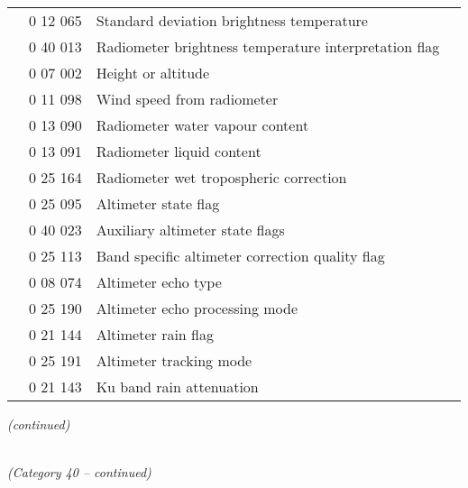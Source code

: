 \begin{longtable}[]{@{}llll@{}}
& 0 12 065 & Standard deviation brightness temperature &\tabularnewline
& 0 40 013 & Radiometer brightness temperature interpretation flag &\tabularnewline
& 0 07 002 & Height or altitude &\tabularnewline
& 0 11 098 & Wind speed from radiometer &\tabularnewline
& 0 13 090 & Radiometer water vapour content &\tabularnewline
& 0 13 091 & Radiometer liquid content &\tabularnewline
& 0 25 164 & Radiometer wet tropospheric correction &\tabularnewline
& 0 25 095 & Altimeter state flag &\tabularnewline
& 0 40 023 & Auxiliary altimeter state flags &\tabularnewline
& 0 25 113 & Band specific altimeter correction quality flag &\tabularnewline
& 0 08 074 & Altimeter echo type &\tabularnewline
& 0 25 190 & Altimeter echo processing mode &\tabularnewline
& 0 21 144 & Altimeter rain flag &\tabularnewline
& 0 25 191 & Altimeter tracking mode &\tabularnewline
& 0 21 143 & Ku band rain attenuation &\tabularnewline
\bottomrule
\end{longtable}

\emph{(continued)}

\emph{\\
(Category 40 -- continued)}

